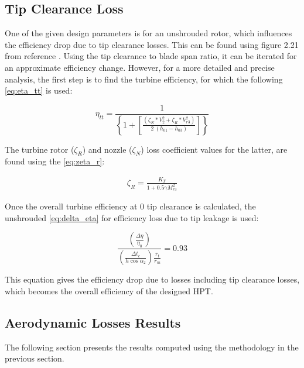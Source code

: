 \documentclass[12pt, letter]{report}
\begin{document}
\subsection{Tip Clearance Loss}

\indent One of the given design parameters is for an unshrouded rotor, which influences the efficiency drop due to tip clearance losses. This can be found using figure 2.21 from reference \cite{moustapha2003}. Using the tip clearance to blade span ratio, it can be iterated for an approximate efficiency change. However, for a more detailed and precise analysis, the first step is to find the turbine efficiency, for which the following \autoref{eq:eta_tt} is used: 

\begin{equation}
\label{eq:eta_tt}
\eta_{tt} = \frac{1}{\left\{ 1 + \left[ \frac{(\zeta_N \ast V_2^2 + \zeta_R \ast V_{r3}^2)}{2\ (h_{01} - h_{03})} \right] \right\}}
\end{equation}

\indent The turbine rotor ($\zeta_R$) and nozzle ($\zeta_N$) loss coefficient values for the latter, are found using the \autoref{eq:zeta_r}: 

\begin{equation}
\label{eq:zeta_r}
    \begin{aligned}
        \zeta_R = \frac{K_T}{1 + 0.5 \gamma M_{r3}^2}
    \end{aligned}
\end{equation}

Once the overall turbine efficiency at 0 tip clearance is calculated, the unshrouded \autoref{eq:delta_eta} for efficiency loss due to tip leakage is used:

\begin{equation}
\label{eq:delta_eta}
\frac{\left( \frac{\Delta\eta}{\eta_0} \right)}{\left( \frac{\Delta t_c}{h \cos{\alpha_2}} \right) \frac{r_t}{r_m}} = 0.93
\end{equation}

This equation gives the efficiency drop due to losses including tip clearance losses, which becomes the overall efficiency of the designed HPT.


\subsection{Aerodynamic Losses Results}
The following section presents the results computed using the methodology in the previous section.
\end{document}
